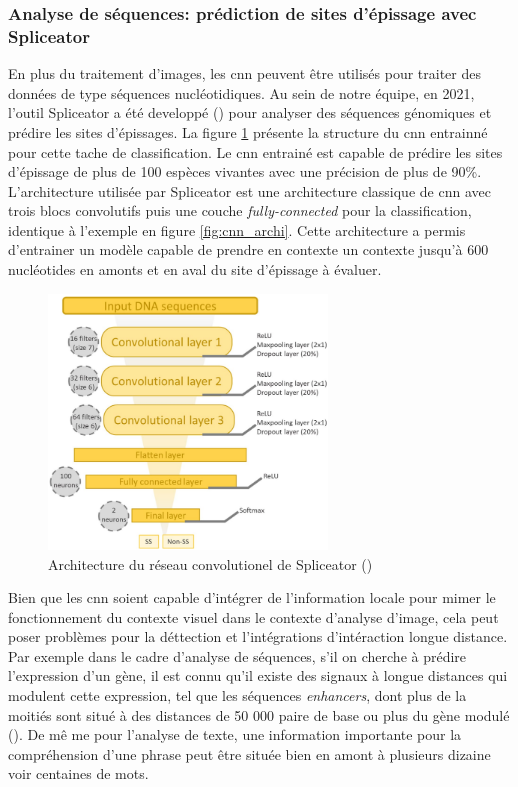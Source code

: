 \subsubsection{Analyse de séquences: prédiction de sites d'épissage avec Spliceator}
En plus du traitement d'images, les \gls{cnn} peuvent être utilisés pour traiter des données de type séquences nucléotidiques. Au sein de notre équipe, en 2021, l'outil Spliceator a été developpé (\cite{scalzitti_spliceator_2021}) pour analyser des séquences génomiques et prédire les sites d'épissages. La figure \ref{fig:splice_archi} présente la structure du \gls{cnn} entrainné pour cette tache de classification. Le \gls{cnn} entrainé est capable de prédire les sites d'épissage de plus de 100 espèces vivantes avec une précision de plus de 90\%. L'architecture utilisée par Spliceator est une architecture classique de \gls{cnn} avec trois blocs convolutifs puis une couche \textit{fully-connected} pour la classification, identique à l'exemple en figure \ref{fig:cnn_archi}. Cette architecture a permis d'entrainer un modèle capable de prendre en contexte un contexte jusqu'à 600 nucléotides en amonts et en aval du site d'épissage à évaluer.
\begin{figure}[!htbp]
 \centering
 \includegraphics[width=0.66\textwidth]{figures/spliceator_nn.png}
 \caption[Architecture du réseau convolutionel de Spliceator]{Architecture du réseau convolutionel de Spliceator (\cite{scalzitti_spliceator_2021})}
 \label{fig:splice_archi}
\end{figure}

Bien que les \gls{cnn} soient capable d'intégrer de l'information locale pour mimer le fonctionnement du contexte visuel dans le contexte d'analyse d'image, cela peut poser problèmes pour la déttection et l'intégrations d'intéraction longue distance. Par exemple dans le cadre d'analyse de séquences, s'il on cherche à prédire l'expression d'un gène, il est connu qu'il existe des signaux à longue distances qui modulent cette expression, tel que les séquences \textit{enhancers}, dont plus de la moitiés sont situé à des distances de 50 000 paire de base ou plus du gène modulé (\cite{chepelev_characterization_2012}). De mê me pour l'analyse de texte, une information importante pour la compréhension d'une phrase peut être située bien en amont à plusieurs dizaine voir centaines de mots.


